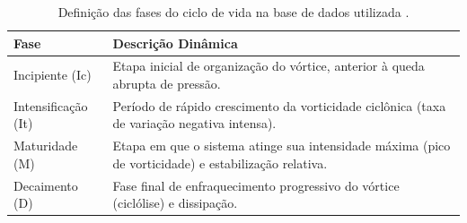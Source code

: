 \begin{table}[ht]
\centering
\caption[Definição das fases do ciclo de vida]{Definição das fases do ciclo de vida na base de dados utilizada \citep{coutodesouza2024new}.}
\label{tab:fases_def}
\begin{tabular*}{\textwidth}{@{\extracolsep{\fill}}lp{10cm}}
\hline
Fase & Descrição Dinâmica \\ 
\hline
Incipiente (Ic) & Etapa inicial de organização do vórtice, anterior à queda abrupta de pressão. \\ 
Intensificação (It) & Período de rápido crescimento da vorticidade ciclônica (taxa de variação negativa intensa). \\ 
Maturidade (M) & Etapa em que o sistema atinge sua intensidade máxima (pico de vorticidade) e estabilização relativa. \\ 
Decaimento (D) & Fase final de enfraquecimento progressivo do vórtice (ciclólise) e dissipação. \\ 
\hline
\end{tabular*}
\end{table}